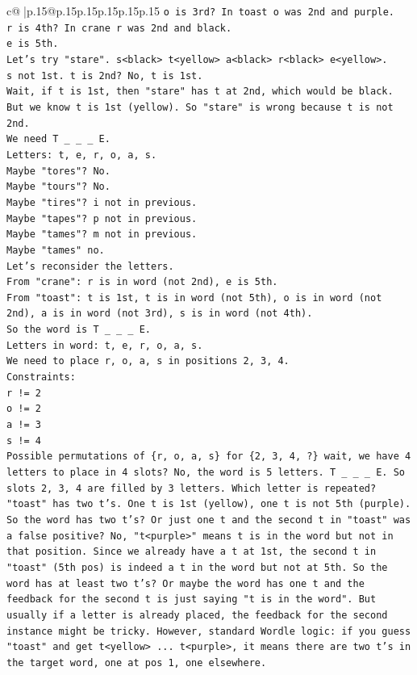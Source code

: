 \documentclass{article}
\begin{document}
{\begin{supertabular}{c@{$\;$}|p{.15\linewidth}@{}p{.15\linewidth}p{.15\linewidth}p{.15\linewidth}p{.15\linewidth}p{.15\linewidth}}
{{{\texttt{o is 3rd? In toast o was 2nd and purple.} \\
\texttt{r is 4th? In crane r was 2nd and black.} \\
\texttt{e is 5th.} \\
\texttt{Let's try "stare". s<black> t<yellow> a<black> r<black> e<yellow>.} \\
\texttt{s not 1st. t is 2nd? No, t is 1st.} \\
\texttt{Wait, if t is 1st, then "stare" has t at 2nd, which would be black. But we know t is 1st (yellow). So "stare" is wrong because t is not 2nd.} \\
\texttt{We need T \_ \_ \_ E.} \\
\texttt{Letters: t, e, r, o, a, s.} \\
\texttt{Maybe "tores"? No.} \\
\texttt{Maybe "tours"? No.} \\
\texttt{Maybe "tires"? i not in previous.} \\
\texttt{Maybe "tapes"? p not in previous.} \\
\texttt{Maybe "tames"? m not in previous.} \\
\texttt{Maybe "tames" no.} \\
\texttt{Let's reconsider the letters.} \\
\texttt{From "crane": r is in word (not 2nd), e is 5th.} \\
\texttt{From "toast": t is 1st, t is in word (not 5th), o is in word (not 2nd), a is in word (not 3rd), s is in word (not 4th).} \\
\texttt{So the word is T \_ \_ \_ E.} \\
\texttt{Letters in word: t, e, r, o, a, s.} \\
\texttt{We need to place r, o, a, s in positions 2, 3, 4.} \\
\texttt{Constraints:} \\
\texttt{r != 2} \\
\texttt{o != 2} \\
\texttt{a != 3} \\
\texttt{s != 4} \\
\texttt{Possible permutations of \{r, o, a, s\} for \{2, 3, 4, ?\} wait, we have 4 letters to place in 4 slots? No, the word is 5 letters. T \_ \_ \_ E. So slots 2, 3, 4 are filled by 3 letters. Which letter is repeated?} \\
\texttt{"toast" has two t's. One t is 1st (yellow), one t is not 5th (purple). So the word has two t's? Or just one t and the second t in "toast" was a false positive? No, "t<purple>" means t is in the word but not in that position. Since we already have a t at 1st, the second t in "toast" (5th pos) is indeed a t in the word but not at 5th. So the word has at least two t's? Or maybe the word has one t and the feedback for the second t is just saying "t is in the word". But usually if a letter is already placed, the feedback for the second instance might be tricky. However, standard Wordle logic: if you guess "toast" and get t<yellow> ... t<purple>, it means there are two t's in the target word, one at pos 1, one elsewhere.} \\
}}}
\end{supertabular}}
\end{document}
